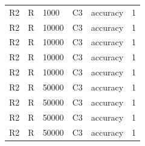 \begin{longtable}{llllrr}
R2 & R & 1000 & C3 & accuracy & 1 \\
R2 & R & 10000 & C3 & accuracy & 1 \\
R2 & R & 10000 & C3 & accuracy & 1 \\
R2 & R & 10000 & C3 & accuracy & 1 \\
R2 & R & 10000 & C3 & accuracy & 1 \\
R2 & R & 50000 & C3 & accuracy & 1 \\
R2 & R & 50000 & C3 & accuracy & 1 \\
R2 & R & 50000 & C3 & accuracy & 1 \\
R2 & R & 50000 & C3 & accuracy & 1 \\
\bottomrule\end{longtable}
